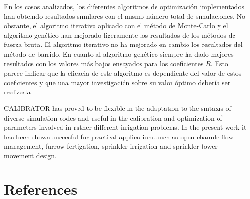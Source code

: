 \documentclass[review,authoryear]{elsarticle}
\begin{document}
En los casos analizados, los diferentes algoritmos de optimización implementados han obtenido resultados similares con el mismo número total de simulaciones. No obstante, el algoritmo iterativo aplicado con el método de Monte-Carlo y el algoritmo genético han mejorado ligeramente los resultados de los métodos de fuerza bruta. El algoritmo iterativo no ha mejorado en cambio los resultados del método de barrido. En cuanto al algoritmo genético siempre ha dado mejores resultados con los valores más bajos ensayados para los coeficientes $R$. Esto parece indicar que la eficacia de este algoritmo es dependiente del valor de estos coeficientes y que una mayor investigación sobre su valor óptimo debería ser realizada.

CALIBRATOR has proved to be flexible in the adaptation to the sintaxis of diverse simulation codes and useful in the calibration and optimization of parameters involved in rather different irrigation problems. In the present work it has been shown succesful for practical applications such as open channle flow management, furrow fertigation, sprinkler irrigation and sprinkler tower movement design.


\section*{References}

\end{document}
